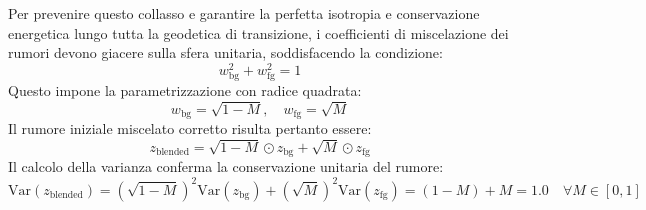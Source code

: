 \documentclass[12pt,a4paper]{report}
\begin{document}
Per prevenire questo collasso e garantire la perfetta isotropia e conservazione energetica lungo tutta la geodetica di transizione, i coefficienti di miscelazione dei rumori devono giacere sulla sfera unitaria, soddisfacendo la condizione:
\begin{equation}
    w_{\text{bg}}^2 + w_{\text{fg}}^2 = 1
\end{equation}
Questo impone la parametrizzazione con radice quadrata:
\begin{equation}
    w_{\text{bg}} = \sqrt{1 - M}, \quad w_{\text{fg}} = \sqrt{M}
\end{equation}
Il rumore iniziale miscelato corretto risulta pertanto essere:
\begin{equation}
    z_{\text{blended}} = \sqrt{1 - M} \odot z_{\text{bg}} + \sqrt{M} \odot z_{\text{fg}}
\end{equation}
Il calcolo della varianza conferma la conservazione unitaria del rumore:
\begin{equation}
    \text{Var}(z_{\text{blended}}) = \left(\sqrt{1 - M}\right)^2 \text{Var}(z_{\text{bg}}) + \left(\sqrt{M}\right)^2 \text{Var}(z_{\text{fg}}) = (1 - M) + M = 1.0 \quad \forall M \in [0, 1]
\end{equation}
\end{document}
